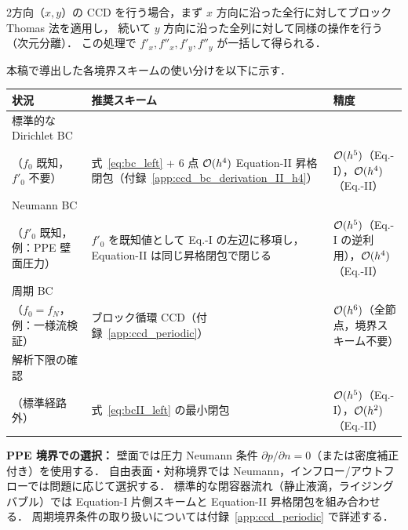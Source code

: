 2方向（$x, y$）の CCD を行う場合，まず $x$ 方向に沿った全行に対してブロック Thomas 法を適用し，
続いて $y$ 方向に沿った全列に対して同様の操作を行う（次元分離）．
この処理で $f'_x, f''_x, f'_y, f''_y$ が一括して得られる．

\begin{tcolorbox}[mybox, title={境界スキーム選択ガイド}]
\label{box:ccd_bc_guide}
本稿で導出した各境界スキームの使い分けを以下に示す．

\medskip
\renewcommand{\arraystretch}{\PaperTableArrayStretch}
\begin{tabular}{>{\raggedright\arraybackslash}p{38mm}>{\raggedright\arraybackslash}p{38mm}>{\raggedright\arraybackslash}p{38mm}}
\hline
\textbf{状況} & \textbf{推奨スキーム} & \textbf{精度} \\
\hline
標準的な Dirichlet BC \\（$f_0$ 既知，$f'_0$ 不要） &
式~\eqref{eq:bc_left} + 6 点 $\mathcal{O}(h^4)$ Equation-II 昇格閉包（付録~\ref{app:ccd_bc_derivation_II_h4}） &
$\mathcal{O}(h^5)$（Eq.-I），$\mathcal{O}(h^4)$（Eq.-II） \\[4pt]
Neumann BC \\（$f'_0$ 既知，例：PPE 壁面圧力） &
$f'_0$ を既知値として Eq.-I の左辺に移項し，Equation-II は同じ昇格閉包で閉じる &
$\mathcal{O}(h^5)$（Eq.-I の逆利用），$\mathcal{O}(h^4)$（Eq.-II） \\[4pt]
周期 BC \\（$f_0 = f_N$，例：一様流検証） &
ブロック循環 CCD（付録~\ref{app:ccd_periodic}） &
$\mathcal{O}(h^6)$（全節点，境界スキーム不要） \\[4pt]
解析下限の確認 \\（標準経路外） &
式~\eqref{eq:bcII_left} の最小閉包 &
$\mathcal{O}(h^5)$（Eq.-I），$\mathcal{O}(h^2)$（Eq.-II） \\
\hline
\end{tabular}

\medskip
\textbf{PPE 境界での選択：}
壁面では圧力 Neumann 条件 $\partial p/\partial n = 0$（または密度補正付き）を使用する．
自由表面・対称境界では Neumann，インフロー/アウトフローでは問題に応じて選択する．
標準的な閉容器流れ（静止液滴，ライジングバブル）では
Equation-I 片側スキームと Equation-II 昇格閉包を組み合わせる．
周期境界条件の取り扱いについては付録~\ref{app:ccd_periodic} で詳述する．
\end{tcolorbox}
